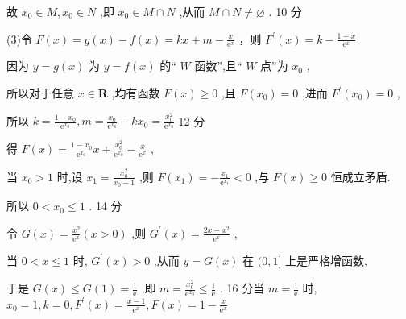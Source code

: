 \documentclass[10pt]{article}
\begin{document}
故 \({x}_{0} \in  M,{x}_{0} \in  N\) ,即 \({x}_{0} \in  M \cap  N\) ,从而 \(M \cap  N \neq  \varnothing\) . 10 分

(3)令 \(F\left( x\right)  = g\left( x\right)  - f\left( x\right)  = {kx} + m - \frac{x}{{\mathrm{e}}^{x}}\) ，则 \({F}^{\prime }\left( x\right)  = k - \frac{1 - x}{{\mathrm{e}}^{x}}\)

因为 \(y = g\left( x\right)\) 为 \(y = f\left( x\right)\) 的“ \(W\) 函数”,且“ \(W\) 点”为 \({x}_{0}\) ,

所以对于任意 \(x \in  \mathbf{R}\) ,均有函数 \(F\left( x\right)  \geq  0\) ,且 \(F\left( {x}_{0}\right)  = 0\) ,进而 \({F}^{\prime }\left( {x}_{0}\right)  = 0\) ,

所以 \(k = \frac{1 - {x}_{0}}{{\mathrm{e}}^{{x}_{0}}},m = \frac{{x}_{0}}{{\mathrm{e}}^{{x}_{0}}} - k{x}_{0} = \frac{{x}_{0}^{2}}{{\mathrm{e}}^{{x}_{0}}}\) 12 分

得 \(F\left( x\right)  = \frac{1 - {x}_{0}}{{\mathrm{e}}^{{x}_{0}}}x + \frac{{x}_{0}^{2}}{{\mathrm{e}}^{{x}_{0}}} - \frac{x}{{\mathrm{e}}^{x}}\) ,

当 \({x}_{0} > 1\) 时,设 \({x}_{1} = \frac{{x}_{0}^{2}}{{x}_{0} - 1}\) ,则 \(F\left( {x}_{1}\right)  =  - \frac{{x}_{1}}{{\mathrm{e}}^{{x}_{1}}} < 0\) ,与 \(F\left( x\right)  \geq  0\) 恒成立矛盾.

所以 \(0 < {x}_{0} \leq  1\) . 14 分

令 \(G\left( x\right)  = \frac{{x}^{2}}{{\mathrm{e}}^{x}}\left( {x > 0}\right)\) ,则 \({G}^{\prime }\left( x\right)  = \frac{{2x} - {x}^{2}}{{\mathrm{e}}^{x}}\) ,

当 \(0 < x \leq  1\) 时, \({G}^{\prime }\left( x\right)  > 0\) ,从而 \(y = G\left( x\right)\) 在 \((0,1\rbrack\) 上是严格增函数,

于是 \(G\left( x\right)  \leq  G\left( 1\right)  = \frac{1}{\mathrm{e}}\) ,即 \(m = \frac{{x}_{0}^{2}}{{\mathrm{e}}^{{x}_{0}}} \leq  \frac{1}{\mathrm{e}}\) . 16 分当 \(m = \frac{1}{\mathrm{e}}\) 时, \({x}_{0} = 1,k = 0,{F}^{\prime }\left( x\right)  = \frac{x - 1}{{\mathrm{e}}^{x}},F\left( x\right)  = 1 - \frac{x}{{\mathrm{e}}^{x}}\)

\begin{center}
\end{center}
\end{document}
